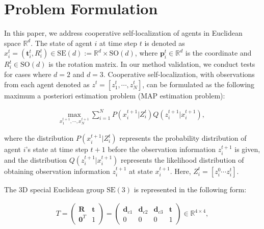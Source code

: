 \documentclass[a4paper,fleqn,10pt,twocolumn]{SICE_ISCS}
\begin{document}
\section{Problem Formulation}

In this paper, we address cooperative self-localization of agents in Euclidean space ${{\mathbb{R}}}^d$.
The state of agent $i$ at time step $t$ is denoted as $x_i^t=({\mathbf{t}}^t_i, R^t_i)\in \mathrm{SE}(d):={{\mathbb{R}}}^d\times \mathrm{SO}(d)$, where ${\mathbf{p}}^t_i\in{{\mathbb{R}}}^d$ is the coordinate and $R^t_i\in \mathrm{SO}(d)$ is the rotation matrix. In our method validation, we conduct tests for cases where $d=2$ and $d=3$. Cooperative self-localization, with observations from each agent denoted as $z^t=[z_1^t, \cdots, z_N^t]$, can be formulated as the following maximum a posteriori estimation problem (MAP estimation problem):

\begin{equation}
\begin{aligned}\label{eq:map}
\underset{x^{t+1}_1, \cdots, x^{t+1}_N}{\text{max}} \: \sum^N_{i=1} P(x^{t+1}_i|Z_i^{t}) Q(z_i^{t+1}|x_i^{t+1}),
\end{aligned}
\end{equation}

where the distribution $P(x^{t+1}_i|Z_i^{t})$ represents the probability distribution of agent $i$'s state at time step $t+1$ before the observation information $z_i^{t+1}$ is given, and the distribution $Q(z_i^{t+1}|x_i^{t+1})$ represents the likelihood distribution of obtaining observation information $z_i^{t+1}$ at state $x_i^{t+1}$. Here, $Z_i^t = [z_i^0 \cdots z_i^t]$.

The 3D special Euclidean group $\mathrm{SE(3)}$ is represented in the following form:

\begin{equation}
\begin{aligned}\label{eq:se3_matrix}
T = 
\begin{pmatrix}
{\mathbf{R}} & {\mathbf{t}} \\
{\mathbf{0}}^T & 1
\end{pmatrix}
=
\begin{pmatrix}
{\mathbf{d}}_{c1} & {\mathbf{d}}_{c2} & {\mathbf{d}}_{c3} & {\mathbf{t}} \\
0 & 0 & 0 & 1
\end{pmatrix} \in {{\mathbb{R}}}^{4\times4},
\end{aligned}
\end{equation}
\end{document}

